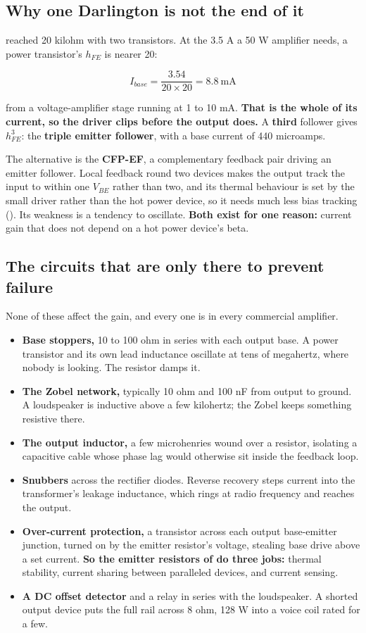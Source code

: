 \subsection{Why one Darlington is not the end of it}
\label{c8:sec:c2}
 reached 20 kilohm with two transistors. At the 3.5 A a 50 W amplifier needs, a power transistor's $h_{FE}$ is nearer 20:

\[
  I_{base} = \frac{3.54}{20 \times 20} = 8.8\ \text{mA}
\]

from a voltage-amplifier stage running at 1 to 10 mA. \textbf{That is the whole of its current, so the driver clips before the output does.} A \textbf{third} follower gives $h_{FE}^3$: the \textbf{triple emitter follower}, with a base current of 440 microamps.

The alternative is the \textbf{CFP-EF}, a complementary feedback pair driving an emitter follower. Local feedback round two devices makes the output track the input to within one $V_{BE}$ rather than two, and its thermal behaviour is set by the small driver rather than the hot power device, so it needs much less bias tracking (). Its weakness is a tendency to oscillate. \textbf{Both exist for one reason:} current gain that does not depend on a hot power device's beta.

\subsection{The circuits that are only there to prevent failure}
\label{c8:sec:c3}
None of these affect the gain, and every one is in every commercial amplifier.

\begin{itemize}
  \item \textbf{Base stoppers,} 10 to 100 ohm in series with each output base. A power transistor and its own lead inductance oscillate at tens of megahertz, where nobody is looking. The resistor damps it.
  \item \textbf{The Zobel network,} typically 10 ohm and 100 nF from output to ground. A loudspeaker is inductive above a few kilohertz; the Zobel keeps something resistive there.
  \item \textbf{The output inductor,} a few microhenries wound over a resistor, isolating a capacitive cable whose phase lag would otherwise sit inside the feedback loop.
  \item \textbf{Snubbers} across the rectifier diodes. Reverse recovery steps current into the transformer's leakage inductance, which rings at radio frequency and reaches the output.
  \item \textbf{Over-current protection,} a transistor across each output base-emitter junction, turned on by the emitter resistor's voltage, stealing base drive above a set current. \textbf{So the emitter resistors of  do three jobs:} thermal stability, current sharing between paralleled devices, and current sensing.
  \item \textbf{A DC offset detector} and a relay in series with the loudspeaker. A shorted output device puts the full rail across 8 ohm, 128 W into a voice coil rated for a few.
\end{itemize}

